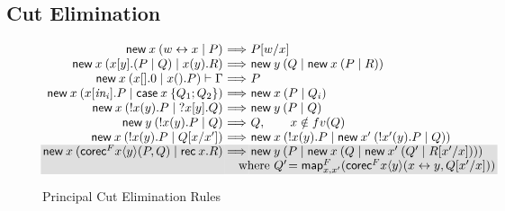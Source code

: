 \documentclass[orivec,envcountsame]{llncs}
\makeatletter
\newcommand{\cpbang}[1]{{! #1}}
\newcommand{\cptyp}[2]{#1 \vdash #2}
\newcommand{\mapname}{\mathsf{map}}
\newcommand{\map}[3]{\mapname^{#1}_{#2}(#3)}
\newcommand{\mkwd}[1]{\mathsf{#1}}
\newcommand{\link}[2]{#1 \leftrightarrow #2}
\newcommand{\cut}[4]{\mkwd{new}\:#1 \: (#3 \mid #4)}
\newcommand{\replicate}[2]{{!#1(#2)}}
\newcommand{\derelict}[2]{{?#1[#2]}}
\newcommand{\rec}[1]{\mkwd{rec}\:#1}
\newcommand{\corecf}[5]{\mkwd{corec}^{#1} #2 \langle #3 \rangle (#4,#5)}
\newcommand{\clabel}[1]{\mathit{#1}}
\renewcommand{\case}[2]{\mkwd{case}\:#1\:\{#2\}}
\newcommand{\sel}[2]{#1[\clabel{#2}]}
\newcommand{\key}{\mkwd}
\newcommand{\ba}{\begin{array}}
\newcommand{\ea}{\end{array}}
\newenvironment{equations}{\[\ba{@{}r@{~}c@{~}l@{}}}{\ea\]}
\newcommand\shaderow{\noalign{\vskip-0.4pt}\rowcolor{shade}[0.6mm]}
\makeatother
\begin{document}
\subsection{Cut Elimination}

\begin{figure}[float]
\vspace{-2mm}
\small
\begin{equations}
\cut{x}{A}{\link{w}{x}}{P}
  &\Longrightarrow& P[w/x] \\
\cut{x}{A \otimes B}{x[y].(P \mid Q)}{x(y).R}
  &\Longrightarrow&
    \cut{y}{A}{Q}{\cut{x}{B}{P}{R}} \\
\cptyp{\cut{x}{1}{x[].0}{x().P}}{\Gamma}
  &\Longrightarrow&
    P \\
\cut{x}{A \oplus B}{\sel{x}{in_i}.P}{\case{x}{Q_1; Q_2}}
  &\Longrightarrow&
    \cut{x}{A}{P}{Q_i} \\
\cut{x}{\cpbang{A}}{\replicate{x}{y}.P}{\derelict{x}{y}.Q}
  &\Longrightarrow&
    \cut{y}{A}{P}{Q} \\
\cut{y}{\cpbang{A}}{\replicate{x}{y}.P}{Q}
  &\Longrightarrow&
     Q, \qquad x \notin fv(Q) \\
\cut{x}{\cpbang{A}}{\replicate{x}{y}.P}{Q[x/x']}
  &\Longrightarrow&
    \cut{x}{\cpbang{A}}{\replicate{x}{y}.P}{\cut{x'}{\cpbang{A}}{\replicate{x'}{y}.P}{Q}} \\ \shaderow
\key{new}\:x\: %
  (\corecf{F}{x}{y}{P}{Q} \mid \rec{x}.R)
  &\Longrightarrow&
    \cut{y}{B}{P}{\cut{x}{F(B)}{Q}{\cut{x'}{F(\nu F)}{Q'}{R[x'/x]}}} \\ \shaderow
&& \hspace{-1em}\text{where }Q'\!= \map{F}{x,x'}{\corecf{F}{x}{y}{\link{x}{y}}{Q[x'/x]}} \\
\end{equations}%
\caption{Principal Cut Elimination Rules}\label{fig:beta-reduction}
\vspace{-2mm}
\end{figure}
\end{document}
